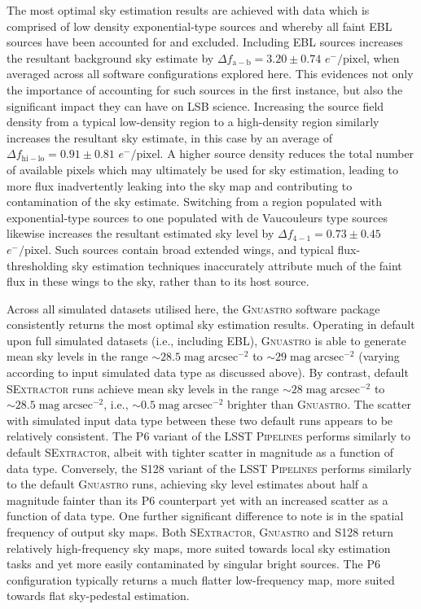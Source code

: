 \documentclass[fleqn,usenatbib,useAMS]{mnras}
\newcommand*{\about}{\mathord\sim}
\newcommand*{\SExtractor}{\textsc{SExtractor}\xspace}
\newcommand*{\Gnuastro}{\textsc{Gnuastro}\xspace}
\newcommand*{\LSSTPs}{\textsc{LSST Pipelines}\xspace}
\newcommand*{\DMA}{\textsc{P6}\xspace}
\newcommand*{\DMB}{\textsc{S128}\xspace}
\begin{document}
The most optimal sky estimation results are achieved with data which is comprised of low density exponential-type sources and whereby all faint EBL sources have been accounted for and excluded. Including EBL sources increases the resultant background sky estimate by $\Delta{f}_{\mathrm{a}-\mathrm{b}}=3.20\pm0.74$ $e^{-}/\textrm{pixel}$, when averaged across all software configurations explored here. This evidences not only the importance of accounting for such sources in the first instance, but also the significant impact they can have on LSB science. Increasing the source field density from a typical low-density region to a high-density region similarly increases the resultant sky estimate, in this case by an average of $\Delta{f}_{\mathrm{hi}-\mathrm{lo}}=0.91\pm0.81$ $e^{-}/\textrm{pixel}$. A higher source density reduces the total number of available pixels which may ultimately be used for sky estimation, leading to more flux inadvertently leaking into the sky map and contributing to contamination of the sky estimate. Switching from a region populated with exponential-type sources to one populated with de Vaucouleurs type sources likewise increases the resultant estimated sky level by $\Delta{f}_{\mathrm{4}-\mathrm{1}}=0.73\pm0.45$ $e^{-}/\textrm{pixel}$. Such sources contain broad extended wings, and typical flux-thresholding sky estimation techniques inaccurately attribute much of the faint flux in these wings to the sky, rather than to its host source.

Across all simulated datasets utilised here, the \Gnuastro software package consistently returns the most optimal sky estimation results. Operating in default upon full simulated datasets (i.e., including EBL), \Gnuastro is able to generate mean sky levels in the range $\about28.5\;\mathrm{mag\;arcsec}^{-2}$ to $\about29\;\mathrm{mag\;arcsec}^{-2}$ (varying according to input simulated data type as discussed above). By contrast, default \SExtractor runs achieve mean sky levels in the range $\about28\;\mathrm{mag\;arcsec}^{-2}$ to $\about28.5\;\mathrm{mag\;arcsec}^{-2}$, i.e., $\about0.5\;\mathrm{mag\;arcsec}^{-2}$ brighter than \Gnuastro. The scatter with simulated input data type between these two default runs appears to be relatively consistent. The \DMA variant of the \LSSTPs performs similarly to default \SExtractor, albeit with tighter scatter in magnitude as a function of data type. Conversely, the \DMB variant of the \LSSTPs performs similarly to the default \Gnuastro runs, achieving sky level estimates about half a magnitude fainter than its \DMA counterpart yet with an increased scatter as a function of data type. One further significant difference to note is in the spatial frequency of output sky maps. Both \SExtractor, \Gnuastro and \DMB return relatively high-frequency sky maps, more suited towards local sky estimation tasks and yet more easily contaminated by singular bright sources. The \DMA configuration typically returns a much flatter low-frequency map, more suited towards flat sky-pedestal estimation. 
\end{document}
